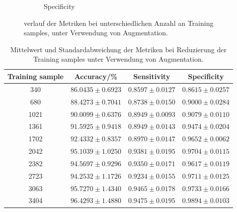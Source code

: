 \begin{figure}[H]
\begin{subfigure}[b]{0.48\textwidth}
    \caption{Specificity}
    \label{fig:augmentation_specificity}
  \end{subfigure}
  \caption{verlauf der Metriken bei unterschiedlichen Anzahl an Training samples, unter Verwendung von Augmentation.}
  \label{fig:augmentation_tu}
\end{figure}
\begin{table}[H]
    \centering
        \begin{tabular}{cccc}
            \toprule
            Training sample & Accuracy/\% & Sensitivity & Specificity\\
            \midrule
            340  & $86.0435 \pm 0.6923$ & $0.8597 \pm 0.0127$ & $0.8615 \pm 0.0257$\\
            680  & $88.4273 \pm 0.7041$ & $0.8738 \pm 0.0150$ & $0.9000 \pm 0.0284$\\
            1021 & $90.0099 \pm 0.6376$ & $0.8949 \pm 0.0093$ & $0.9079 \pm 0.0110$\\
            1361 & $91.5925 \pm 0.9418$ & $0.8949 \pm 0.0143$ & $0.9474 \pm 0.0204$\\
            1702 & $92.4332 \pm 0.8357$ & $0.8970 \pm 0.0147$ & $0.9652 \pm 0.0062$\\
            2042 & $95.1039 \pm 1.0250$ & $0.9381 \pm 0.0195$ & $0.9704 \pm 0.0115$\\
            2382 & $94.5697 \pm 0.9296$ & $0.9350 \pm 0.0171$ & $0.9617 \pm 0.0119$\\
            2723 & $94.2532 \pm 1.1726$ & $0.9234 \pm 0.0155$ & $0.9711 \pm 0.0125$\\
            3063 & $95.7270 \pm 1.4340$ & $0.9465 \pm 0.0178$ & $0.9733 \pm 0.0166$\\
            3404 & $96.4293 \pm 1.4880$ & $0.9475 \pm 0.0195$ & $0.9894 \pm 0.0103$\\
            \bottomrule
        \end{tabular}
  \caption{Mittelwert und Standardabweichung der Metriken bei Reduzierung der Training samples unter Verwendung von Augmentation.}
  \label{tab:augm-tunotu}
\end{table}

